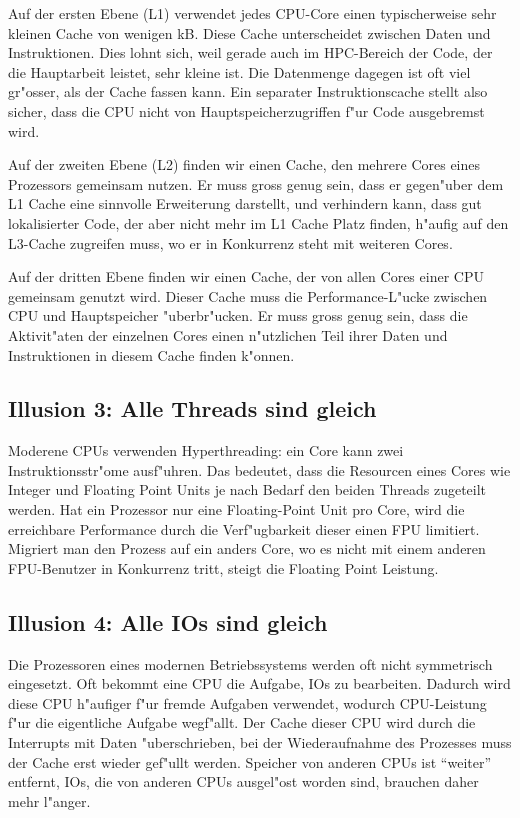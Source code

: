 Auf der ersten Ebene (L1) verwendet
jedes CPU-Core einen typischerweise sehr kleinen Cache von wenigen
kB. Diese Cache unterscheidet zwischen Daten und Instruktionen.
Dies lohnt sich, weil gerade auch im HPC-Bereich der Code, der die
Hauptarbeit leistet, sehr kleine ist. Die Datenmenge dagegen ist oft
viel gr"osser, als der Cache fassen kann.
Ein separater Instruktionscache
stellt also sicher, dass die CPU nicht von Hauptspeicherzugriffen f"ur
Code ausgebremst wird.

Auf der zweiten Ebene (L2) finden wir einen Cache, den mehrere Cores eines
Prozessors gemeinsam nutzen.
Er muss gross genug sein, dass er gegen"uber
dem L1 Cache eine sinnvolle Erweiterung darstellt, und verhindern kann,
dass gut lokalisierter Code, der aber nicht mehr im L1 Cache Platz finden,
h"aufig auf den L3-Cache zugreifen muss, wo er in Konkurrenz steht mit
weiteren Cores.

Auf der dritten Ebene finden wir einen Cache, der von allen Cores einer
CPU gemeinsam genutzt wird. Dieser Cache muss die Performance-L"ucke
zwischen CPU und Hauptspeicher "uberbr"ucken.
Er muss gross genug sein, dass die Aktivit"aten der einzelnen Cores einen
n"utzlichen Teil ihrer Daten und Instruktionen in diesem Cache finden 
k"onnen. 

\subsection{Illusion 3: Alle Threads sind gleich}
Moderene CPUs verwenden Hyperthreading: ein Core kann zwei Instruktionsstr"ome
ausf"uhren.
Das bedeutet, dass die Resourcen eines Cores wie Integer und
Floating Point Units je nach Bedarf den beiden Threads zugeteilt werden.
Hat ein Prozessor nur eine Floating-Point Unit pro Core, wird die
erreichbare Performance durch die Verf"ugbarkeit dieser einen FPU
limitiert.
Migriert man den Prozess auf ein anders Core, wo es nicht mit einem anderen
FPU-Benutzer in Konkurrenz tritt, steigt die Floating Point Leistung.

\subsection{Illusion 4: Alle IOs sind gleich}
Die Prozessoren eines modernen Betriebssystems werden oft nicht symmetrisch
eingesetzt.
Oft bekommt eine CPU die Aufgabe, IOs zu bearbeiten.
Dadurch wird diese CPU h"aufiger f"ur fremde Aufgaben verwendet, wodurch
CPU-Leistung f"ur die eigentliche Aufgabe wegf"allt.
Der Cache dieser CPU wird durch die Interrupts mit Daten "uberschrieben,
bei der Wiederaufnahme des Prozesses muss der Cache erst wieder
gef"ullt werden.
Speicher von anderen CPUs ist ``weiter'' entfernt, IOs, die von anderen
CPUs ausgel"ost worden sind, brauchen daher mehr l"anger.

